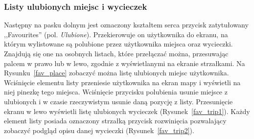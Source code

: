         \subsubsection{Listy ulubionych miejsc i wycieczek}
        Następny na pasku dolnym jest oznaczony kształtem serca przycisk zatytułowany ,,Favourites'' (pol. \emph{Ulubione}). Przekierowuje on użytkownika do ekranu, na którym wylistowane są polubione przez
        użytkownika miejsca oraz wycieczki. Znajdują się one na osobnych listach, które przełączać można, przesuwając palcem w prawo lub w lewo, zgodnie z wyświetlanymi na ekranie strzałkami.
        Na Rysunku~\ref{fav_place} zobaczyć można listę ulubionych miejsc użytkownika. Wciśnięcie elementu listy przeniesie użytkownika na ekran mapy i wyświetli na niej pinezkę tego miejsca.
        Wciśnięcie przycisku polubienia usunie miejsce z ulubionych i w czasie rzeczywistym usunie daną pozycję z listy. Przesunięcie ekranu w lewo wyświetli listę ulubionych wycieczek  (Rysunek~\ref{fav_trip1}).
        Każdy element listy posiada oznaczony strzałką przycisk rozwinięcia pozwalający zobaczyć podgląd opisu danej wycieczki (Rysunek~\ref{fav_trip2}).
        
